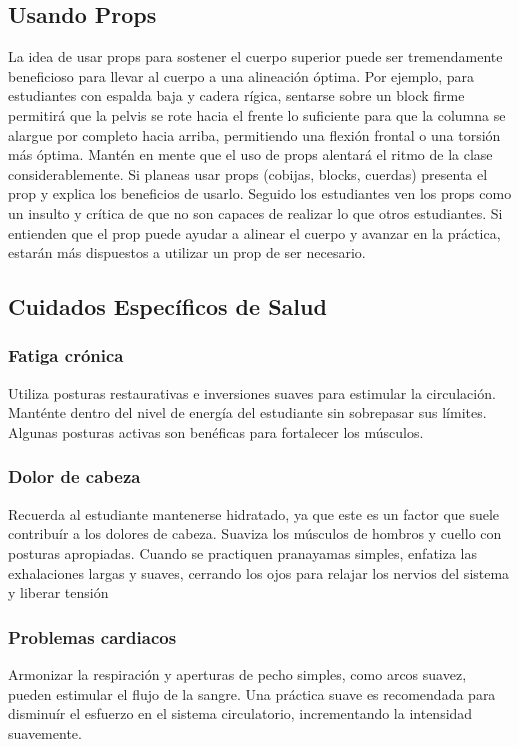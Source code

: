 \subsection{Usando Props}
La idea de usar props para sostener el cuerpo superior puede ser tremendamente beneficioso para llevar al cuerpo a una alineación óptima. Por ejemplo, para estudiantes con espalda baja y cadera rígica, sentarse sobre un block firme permitirá que la pelvis se rote hacia el frente lo suficiente para que la columna se alargue por completo hacia arriba, permitiendo una flexión frontal o una torsión más óptima. Mant\'en en mente que el uso de props alentará el ritmo de la clase considerablemente. Si planeas usar props (cobijas, blocks, cuerdas) presenta el prop y explica los beneficios de usarlo. Seguido los estudiantes ven los props como un insulto y crítica de que no son capaces de realizar lo que otros estudiantes. Si entienden que el prop puede ayudar a alinear el cuerpo y avanzar en la práctica, estarán más dispuestos a utilizar un prop de ser necesario.

\subsection{Cuidados Específicos de Salud}
\subsubsection{Fatiga crónica}
Utiliza posturas restaurativas e inversiones suaves para estimular la circulación. Mant\'ente dentro del nivel de energía del estudiante sin sobrepasar sus límites. Algunas posturas activas son ben\'eficas para fortalecer los músculos.
\subsubsection{Dolor de cabeza}
Recuerda al estudiante mantenerse hidratado, ya que este es un factor que suele contribuír a los dolores de cabeza. Suaviza los músculos de hombros y cuello con posturas apropiadas. Cuando se practiquen pranayamas simples, enfatiza las exhalaciones largas y suaves, cerrando los ojos para relajar los nervios del sistema y liberar tensión
\subsubsection{Problemas cardiacos}
Armonizar la respiración y aperturas de pecho simples, como arcos suavez, pueden estimular el flujo de la sangre. Una práctica suave es recomendada para disminuír el esfuerzo en el sistema circulatorio, incrementando la intensidad suavemente.
